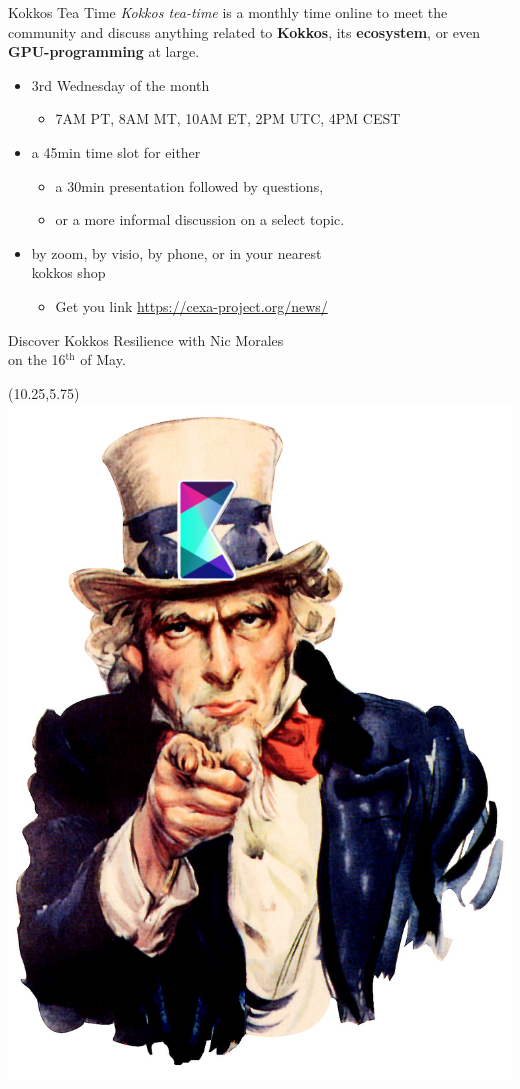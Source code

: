 \begin{frame}[fragile]{Kokkos Tea Time}
\emph{Kokkos tea-time} is a monthly time online to meet the community and discuss anything related to \textbf{Kokkos}, its \textbf{ecosystem}, or even \textbf{GPU-programming} at large.
\medskip
\begin{itemize}
  \item 3rd Wednesday of the month
  \begin{itemize}
   \item {\small7AM PT, 8AM MT, 10AM ET, 2PM UTC, 4PM CEST}
  \end{itemize}
  \item a 45min time slot for either
  \begin{itemize}
    \item a 30min presentation followed by questions,
    \item or a more informal discussion on a select topic.
  \end{itemize}
  \item by zoom, by visio, by phone, or in your nearest\\ kokkos shop
  \begin{itemize}
   \item Get you link \url{https://cexa-project.org/news/}
  \end{itemize}
\end{itemize}
\vfill
Discover Kokkos Resilience with Nic Morales\\
on the 16$^{\text{th}}$ of May.

\begin{textblock}{4.5}(10.25,5.75)
\centering
\includegraphics[width=.45\textwidth]{4_3/tea-time_we_want_you}


\end{textblock}
\end{frame}
